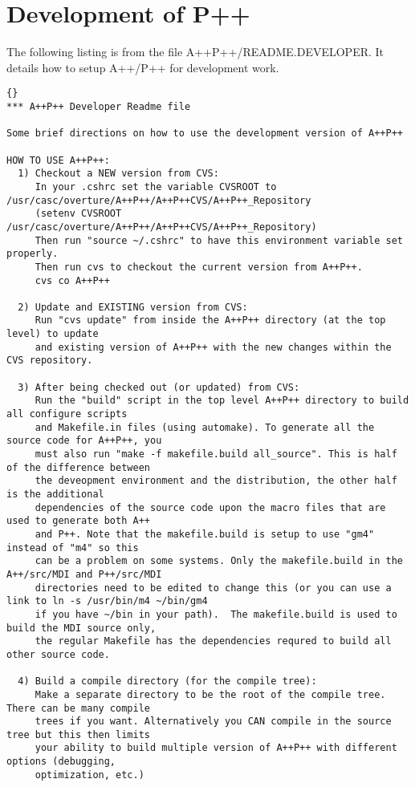 \documentclass[10pt]{llncs}
\begin{document}
\newpage
\section{Development of P++}
   The following listing is from the file A++P++/README.DEVELOPER.  It details
how to setup A++/P++ for development work.

\vspace{0.5in}

\begin{lstlisting}{}
*** A++P++ Developer Readme file

Some brief directions on how to use the development version of A++P++

HOW TO USE A++P++:
  1) Checkout a NEW version from CVS:
     In your .cshrc set the variable CVSROOT to /usr/casc/overture/A++P++/A++P++CVS/A++P++_Repository
     (setenv CVSROOT /usr/casc/overture/A++P++/A++P++CVS/A++P++_Repository)
     Then run "source ~/.cshrc" to have this environment variable set properly.
     Then run cvs to checkout the current version from A++P++.
     cvs co A++P++

  2) Update and EXISTING version from CVS:
     Run "cvs update" from inside the A++P++ directory (at the top level) to update
     and existing version of A++P++ with the new changes within the CVS repository.

  3) After being checked out (or updated) from CVS:
     Run the "build" script in the top level A++P++ directory to build all configure scripts
     and Makefile.in files (using automake). To generate all the source code for A++P++, you 
     must also run "make -f makefile.build all_source". This is half of the difference between
     the deveopment environment and the distribution, the other half is the additional
     dependencies of the source code upon the macro files that are used to generate both A++
     and P++. Note that the makefile.build is setup to use "gm4" instead of "m4" so this
     can be a problem on some systems. Only the makefile.build in the A++/src/MDI and P++/src/MDI
     directories need to be edited to change this (or you can use a link to ln -s /usr/bin/m4 ~/bin/gm4
     if you have ~/bin in your path).  The makefile.build is used to build the MDI source only,
     the regular Makefile has the dependencies requred to build all other source code.

  4) Build a compile directory (for the compile tree):
     Make a separate directory to be the root of the compile tree. There can be many compile 
     trees if you want. Alternatively you CAN compile in the source tree but this then limits
     your ability to build multiple version of A++P++ with different options (debugging,
     optimization, etc.)


\end{lstlisting}
\end{document}
